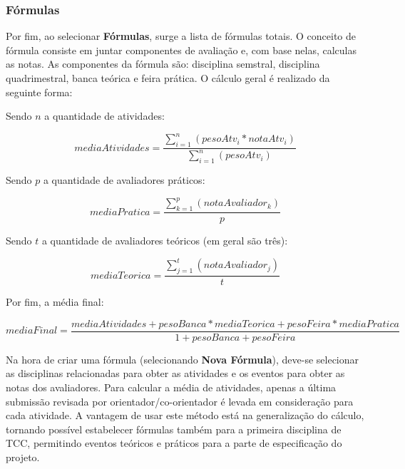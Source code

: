 \subsubsection{Fórmulas}
Por fim, ao selecionar \textbf{Fórmulas}, surge a lista de fórmulas totais. O conceito de fórmula consiste em juntar componentes de avaliação e, com base nelas, calculas as notas. As componentes da fórmula são: disciplina semstral, disciplina quadrimestral, banca teórica e feira prática. O cálculo geral é realizado da seguinte forma:

Sendo \begin{math}n\end{math} a quantidade de atividades:

\begin{equation}
    mediaAtividades = \frac{\sum_{i=1}^{n}(pesoAtv_{i}*notaAtv_{i})}{\sum_{i=1}^{n}(pesoAtv_{i})}
    \label{eq:activities}
\end{equation}

Sendo \begin{math}p\end{math} a quantidade de avaliadores práticos:

\begin{equation}
    mediaPratica = \frac{\sum_{k=1}^{p}(notaAvaliador_{k})}{p}
    \label{eq:practical}
\end{equation}

Sendo \begin{math}t\end{math} a quantidade de avaliadores teóricos (em geral são três):

\begin{equation}
    mediaTeorica = \frac{\sum_{j=1}^{t}(notaAvaliador_{j})}{t}
    \label{eq:theoretical}
\end{equation}

Por fim, a média final:

\begin{equation}
    mediaFinal = \frac{mediaAtividades + pesoBanca * mediaTeorica + pesoFeira * mediaPratica}{1 + pesoBanca + pesoFeira}
    \label{eq:final}
\end{equation}

Na hora de criar uma fórmula (selecionando \textbf{Nova Fórmula}), deve-se selecionar as disciplinas relacionadas para obter as atividades e os eventos para obter as notas dos avaliadores. Para calcular a média de atividades, apenas a última submissão revisada por orientador/co-orientador é levada em consideração para cada atividade. A vantagem de usar este método está na generalização do cálculo, tornando possível estabelecer fórmulas também para a primeira disciplina de TCC, permitindo eventos teóricos e práticos para a parte de especificação do projeto.

